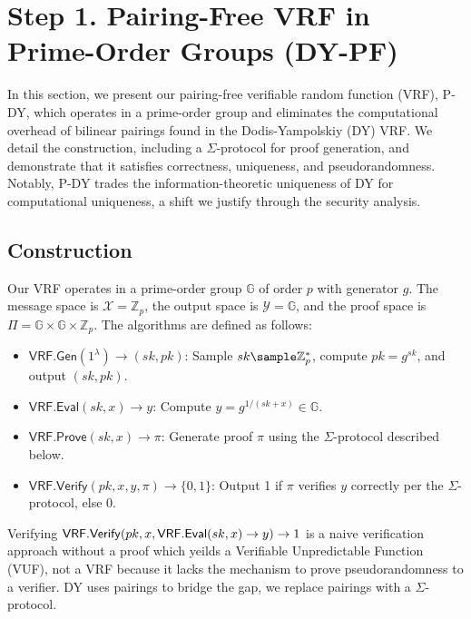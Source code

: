 \section{Step 1. Pairing-Free VRF in Prime-Order Groups (DY-PF)}\label{sec-dy-pf}

In this section, we present our pairing-free verifiable random function (VRF), P-DY, which operates in a prime-order group and eliminates the computational overhead of bilinear pairings found in the Dodis-Yampolskiy (DY) VRF. We detail the construction, including a $\Sigma$-protocol for proof generation, and demonstrate that it satisfies correctness, uniqueness, and pseudorandomness. Notably, P-DY trades the information-theoretic uniqueness of DY for computational uniqueness, a shift we justify through the security analysis.

\subsection{Construction}

Our VRF operates in a prime-order group $\mathbb{G}$ of order $p$ with generator $g$. The message space is $\mathcal{X} = \mathbb{Z}_p$, the output space is $\mathcal{Y} = \mathbb{G}$, and the proof space is $\Pi = \mathbb{G} \times \mathbb{G} \times \mathbb{Z}_p$. The algorithms are defined as follows:

\begin{itemize}
    \item $\mathsf{VRF.Gen}(1^\lambda) \to (sk, pk)$: Sample $sk \sample \mathbb{Z}_p^*$, compute $pk = g^{sk}$, and output $(sk, pk)$.
    \item $\mathsf{VRF.Eval}(sk, x) \to y$: Compute $y = g^{1/(sk + x)} \in \mathbb{G}$.
    \item $\mathsf{VRF.Prove}(sk, x) \to \pi$: Generate proof $\pi$ using the $\Sigma$-protocol described below.
    \item $\mathsf{VRF.Verify}(pk, x, y, \pi) \to \{0, 1\}$: Output 1 if $\pi$ verifies $y$ correctly per the $\Sigma$-protocol, else 0.
\end{itemize}

\begin{remark}
    Verifying $\mathsf{VRF.Verify}(pk, x, \mathsf{VRF.Eval}(sk, x) \to y) \to 1$ is a naive verification approach without a proof which yeilds a Verifiable Unpredictable Function (VUF), not a VRF because it lacks the mechanism to prove pseudorandomness to a verifier. DY uses pairings to bridge the gap, we replace pairings with a $\Sigma$-protocol. 
\end{remark}

